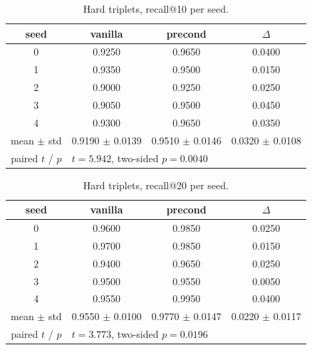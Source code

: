 \begin{table}[H]
\centering
\caption{Hard triplets, recall@10 per seed.}
\label{tab:recall-hard-K10}
\begin{tabular}{c c c c}
\toprule
seed & vanilla & precond & $\Delta$ \\
\midrule
0 & 0.9250 & 0.9650 & 0.0400 \\
1 & 0.9350 & 0.9500 & 0.0150 \\
2 & 0.9000 & 0.9250 & 0.0250 \\
3 & 0.9050 & 0.9500 & 0.0450 \\
4 & 0.9300 & 0.9650 & 0.0350 \\
\midrule
mean $\pm$ std & 0.9190 $\pm$ 0.0139 & 0.9510 $\pm$ 0.0146 & 0.0320 $\pm$ 0.0108 \\
paired $t$ / $p$ & \multicolumn{3}{l}{$t = 5.942$, two-sided $p = 0.0040$} \\
\bottomrule
\end{tabular}
\end{table}

\begin{table}[H]
\centering
\caption{Hard triplets, recall@20 per seed.}
\label{tab:recall-hard-K20}
\begin{tabular}{c c c c}
\toprule
seed & vanilla & precond & $\Delta$ \\
\midrule
0 & 0.9600 & 0.9850 & 0.0250 \\
1 & 0.9700 & 0.9850 & 0.0150 \\
2 & 0.9400 & 0.9650 & 0.0250 \\
3 & 0.9500 & 0.9550 & 0.0050 \\
4 & 0.9550 & 0.9950 & 0.0400 \\
\midrule
mean $\pm$ std & 0.9550 $\pm$ 0.0100 & 0.9770 $\pm$ 0.0147 & 0.0220 $\pm$ 0.0117 \\
paired $t$ / $p$ & \multicolumn{3}{l}{$t = 3.773$, two-sided $p = 0.0196$} \\
\bottomrule
\end{tabular}
\end{table}
